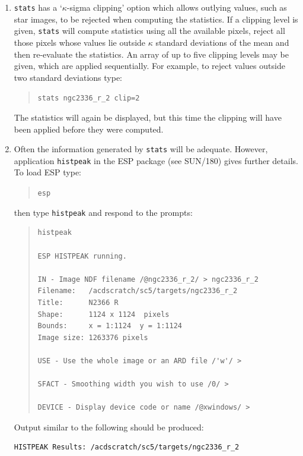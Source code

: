 \documentclass[twoside,11pt]{article}
\newcommand{\xref}[3]{#1}
\begin{document}
\begin{enumerate}
  \item {\tt stats} has a `$\kappa$-sigma clipping' option which allows
   outlying values, such as star images, to be rejected when computing
   the statistics.  If a clipping level is given, {\tt stats} will
   compute statistics using all the available pixels, reject all those
   pixels whose values lie outside $\kappa$ standard deviations of the mean
   and then re-evaluate the statistics.  An array of up to five clipping
   levels may be given, which are applied sequentially.  For example,
   to reject values outside two standard deviations type:

  \begin{quote}
   {\tt stats ngc2336\_r\_2 clip=2}
  \end{quote}

   The statistics will again be displayed, but this time the clipping
   will have been applied before they were computed.

  \item Often the information generated by {\tt stats} will be adequate.
   However, application {\tt histpeak}  in the ESP package (see
   \xref{SUN/180}{sun180}{}\/\cite{SUN180}) gives further details.  To
   load ESP type:

  \begin{quote}
   {\tt esp}
  \end{quote}

   then type {\tt histpeak} and respond to the prompts:

  \begin{quote}
  \begin{verbatim}
histpeak

ESP HISTPEAK running.

IN - Image NDF filename /@ngc2336_r_2/ > ngc2336_r_2
Filename:   /acdscratch/sc5/targets/ngc2336_r_2
Title:      N2366 R
Shape:      1124 x 1124  pixels
Bounds:     x = 1:1124  y = 1:1124
Image size: 1263376 pixels

USE - Use the whole image or an ARD file /'w'/ >

SFACT - Smoothing width you wish to use /0/ >

DEVICE - Display device code or name /@xwindows/ >
\end{verbatim}
  \end{quote}

   Output similar to the following should be produced:

  \begin{verbatim}
HISTPEAK Results: /acdscratch/sc5/targets/ngc2336_r_2


\end{verbatim}
\end{enumerate}
\end{document}
